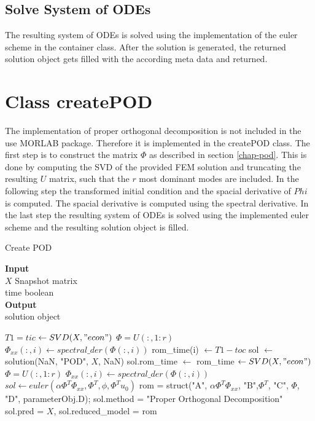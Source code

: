 \subsection{Solve System of ODEs}
The resulting system of ODEs is solved using the implementation of the euler scheme in the container class.
After the solution is generated, the returned solution object gets filled with the according meta data and returned.

\section{Class createPOD}
The implementation of proper orthogonal decomposition is not included in the use MORLAB package.
Therefore it is implemented in the createPOD class.
The first step is to construct the matrix \(\Phi\) as described in section \ref{chap-pod}.
This is done by computing the SVD of the provided FEM solution and truncating the resulting \(U\) matrix, such that the \(r\) most dominant modes are included.
In the following step the transformed initial condition and the spacial derivative of \(Phi\) is computed.
The spacial derivative is computed using the spectral derivative.
In the last step the resulting system of ODEs is solved using the implemented euler scheme and the resulting solution object is filled.
\begin{algorithm}[H]
\caption{Create POD}
\textbf{Input} \\
\hspace*{\algorithmicindent} $X$ Snapshot matrix \\
\hspace*{\algorithmicindent} time boolean \\
\textbf{Output} \\
\hspace*{\algorithmicindent} solution object
\begin{algorithmic}[1]
\State $T1 = tic$
\State [$U$, $S$, $V$] $\gets SVD(X, "econ")$
\State $\Phi = U(:, 1:r)$
\State $\Phi_{xx}(:, i) \gets spectral\_der(\Phi(:, i))$
\State rom\_time(i) $\gets T1 - toc$
\EndFor
\EndFor
\State sol $\gets$ solution(NaN, "POD", $X$, NaN)
\State sol.rom\_time $\gets$ rom\_time
\EndIf
\State [$U$, $S$, $V$] $\gets SVD(X, "econ")$
\State $\Phi = U(:, 1:r)$
\State $\Phi_{xx}(:, i) \gets spectral\_der(\Phi(:, i))$
\EndFor
\State $sol \gets euler(\alpha \Phi^{T} \Phi_{xx}, \Phi^{T}, \phi, \Phi^{T} u_0)$
\State rom = struct("A", $\alpha \Phi^{T} \Phi_{xx}$, "B",$\Phi^{T}$, "C", $\Phi$, "D", parameterObj.D);
\State sol.method = "Proper Orthogonal Decomposition"
\State sol.pred = $X$, sol.reduced\_model = rom
\EndProcedure
\end{algorithmic}
\end{algorithm}
